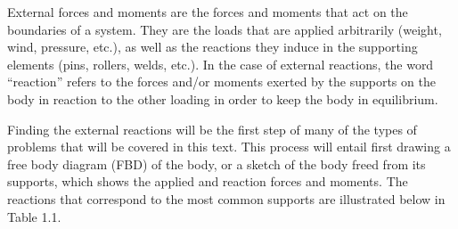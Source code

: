\documentclass[
  letterpaper,
  DIV=11,
  numbers=noendperiod]{scrreprt}
\begin{document}
External forces and moments are the forces and moments that act on the
boundaries of a system. They are the loads that are applied arbitrarily
(weight, wind, pressure, etc.), as well as the reactions they induce in
the supporting elements (pins, rollers, welds, etc.). In the case of
external reactions, the word ``reaction'' refers to the forces and/or
moments exerted by the supports on the body in reaction to the other
loading in order to keep the body in equilibrium.

Finding the external reactions will be the first step of many of the
types of problems that will be covered in this text. This process will
entail first drawing a free body diagram (FBD) of the body, or a sketch
of the body freed from its supports, which shows the applied and
reaction forces and moments. The reactions that correspond to the most
common supports are illustrated below in Table 1.1.
\end{document}

